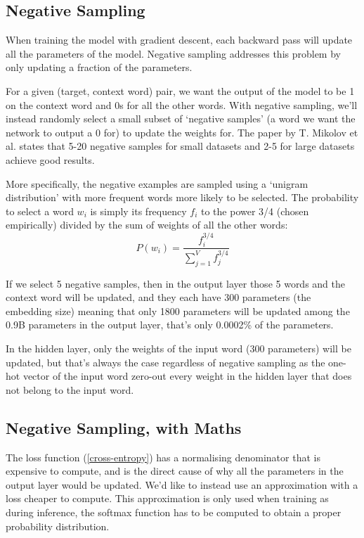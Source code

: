 \subsection{Negative Sampling}
When training the model with gradient descent, each backward pass will update all the parameters of the model. Negative sampling addresses this problem by only updating a fraction of the parameters.

For a given (target, context word) pair, we want the output of the model to be 1 on the context word and 0s for all the other words. With negative sampling, we'll instead randomly select a small subset of `negative samples' (a word we want the network to output a 0 for) to update the weights for. The paper by T. Mikolov et al. \cite{word2vec2} states that 5-20 negative samples for small datasets and 2-5 for large datasets achieve good results.

More specifically, the negative examples are sampled using a `unigram distribution' with more frequent words more likely to be selected. The probability to select a word $w_i$ is simply its frequency $f_i$ to the power 3/4 (chosen empirically) divided by the sum of weights of all the other words:
\begin{equation}
    P(w_i) = \frac{f_i^{3/4}}{\sum_{j=1}^V f_j^{3/4}}
\end{equation}

If we select 5 negative samples, then in the output layer those 5 words and the context word will be updated, and they each have 300 parameters (the embedding size) meaning that only 1800 parameters will be updated among the 0.9B parameters in the output layer, that's only 0.0002\% of the parameters.

In the hidden layer, only the weights of the input word (300 parameters) will be updated, but that's always the case regardless of negative sampling as the one-hot vector of the input word zero-out every weight in the hidden layer that does not belong to the input word.

\subsection{Negative Sampling, with Maths}
The loss function (\ref{cross-entropy}) has a normalising denominator that is expensive to compute, and is the direct cause of why all the parameters in the output layer would be updated. We'd like to instead use an approximation with a loss cheaper to compute. This approximation is only used when training as during inference, the softmax function has to be computed to obtain a proper probability distribution.


